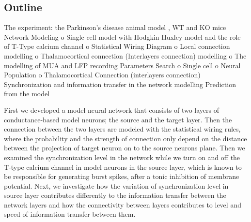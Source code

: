 \subsection{Outline}

The experiment: the Parkinson’s disease animal model , WT and KO mice
Network Modeling
o Single cell model with Hodgkin Huxley model and the role of T-Type calcium channel
o Statistical Wiring Diagram
o Local connection modelling
o Thalamocortical connection (Interlayers connection) modelling
o The modelling of MUA and LFP recording
Parameters Search
o Single cell
o Neural Population
o Thalamocortical Connection (interlayers connection)
Synchronization and information transfer in the network modelling
Prediction from the model

First we developed a model neural network that consists of two layers of conductance-based model neurons; the source and the target layer. Then the connection between the two layers are modeled with the statistical wiring rules, where the probability and the strength of connection only depend on the distance between the projection of target neuron on to the source neurons plane. Then we examined the synchronization level in the network while we turn on and off the T-type calcium channel in model neurons in the source layer, which is known to be responsible for generating burst spikes, after a tonic inhibition of membrane potential. Next, we investigate how the variation of synchronization level in source layer contributes differently to the information transfer between the network layers and how the connectivity between layers contributes to level and speed of information transfer between them. 